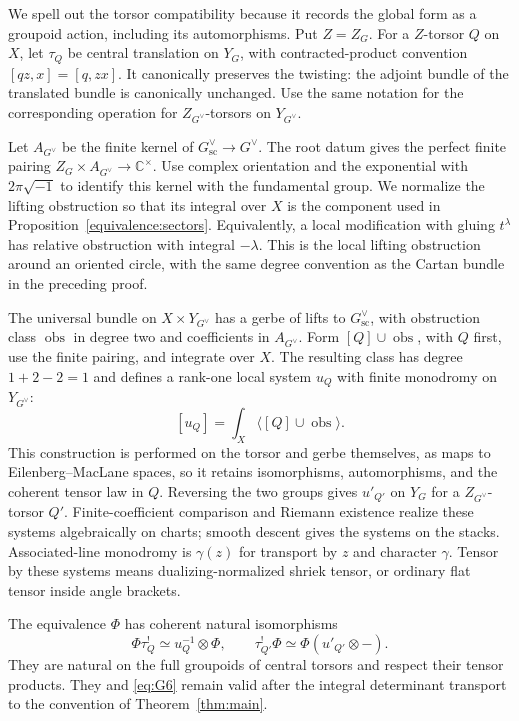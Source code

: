 We spell out the torsor compatibility because it records the global
form as a groupoid action, including its automorphisms.  Put \(Z=Z_G\).
For a \(Z\)-torsor \(Q\) on \(X\), let \(\tau_Q\) be central
translation on \(Y_G\), with contracted-product convention
\([qz,x]=[q,zx]\).  It canonically preserves the twisting: the
adjoint bundle of the translated bundle is canonically unchanged.
Use the same notation for the corresponding operation for
\(Z_{G^\vee}\)-torsors on \(Y_{G^\vee}\).

Let \(A_{G^\vee}\) be the finite kernel of
\(G^\vee_{\mathrm{sc}}\to G^\vee\).  The root datum gives the
perfect finite pairing
\(Z_G\times A_{G^\vee}\to\mathbb C^\times\).  Use complex
orientation and the exponential with \(2\pi\sqrt{-1}\) to identify
this kernel with the fundamental group.  We normalize the lifting
obstruction so that its integral over \(X\) is the component used in
Proposition~\ref{equivalence:sectors}.  Equivalently, a local
modification with gluing \(t^\lambda\) has relative obstruction
with integral \(-\lambda\).  This is the local lifting obstruction
around an oriented circle, with the same degree convention as the
Cartan bundle in the preceding proof.

The universal bundle on \(X\times Y_{G^\vee}\) has a gerbe of lifts
to \(G^\vee_{\mathrm{sc}}\), with obstruction class
\(\operatorname{obs}\) in degree two and coefficients in
\(A_{G^\vee}\).  Form \([Q]\cup\operatorname{obs}\), with
\(Q\) first, use the finite pairing, and integrate over \(X\).
The resulting class has degree \(1+2-2=1\) and defines a rank-one
local system \(u_Q\) with finite monodromy on \(Y_{G^\vee}\):
\[
 [u_Q]=\int_X\bigl\langle[Q]\cup\operatorname{obs}\bigr\rangle.
\]
This construction is performed on the
torsor and gerbe themselves, as maps to Eilenberg--MacLane spaces,
so it retains isomorphisms, automorphisms, and the coherent tensor law
in \(Q\).  Reversing the two groups gives \(u'_{Q'}\) on \(Y_G\)
for a \(Z_{G^\vee}\)-torsor \(Q'\).  Finite-coefficient comparison
and Riemann existence realize these systems algebraically on charts;
smooth descent gives the systems on the stacks.  Associated-line
monodromy is \(\gamma(z)\) for transport by \(z\) and character
\(\gamma\).  Tensor by these systems means dualizing-normalized
shriek tensor, or ordinary flat tensor inside angle brackets.

\begin{theorem}\label{equivalence:central}
The equivalence \(\Phi\) has coherent natural isomorphisms
\begin{equation}\label{eq:G7}
 \Phi\tau_Q^!\simeq u_Q^{-1}\otimes\Phi,
 \qquad
 \tau_{Q'}^!\Phi\simeq\Phi(u'_{Q'}\otimes-).
\end{equation}
They are natural on the full groupoids of central torsors and respect
their tensor products.  They and \eqref{eq:G6} remain valid after the
integral determinant transport to the convention of
Theorem~\ref{thm:main}.
\end{theorem}

